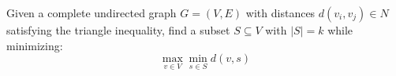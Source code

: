 \documentclass{article}
\begin{document}
Given a complete undirected graph $G = (V, E)$ with distances $d(v_i, v_j) \in N$ satisfying the triangle inequality, find a subset $S \subseteq V$ with $|S| = k$ while minimizing: 
$$\max\limits_{v \in V}\min\limits_{s \in S} d(v,s)$$
\end{document}
